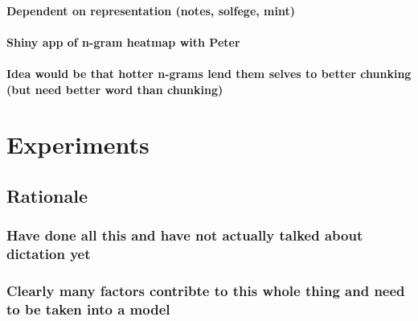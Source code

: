\documentclass[]{book}
\theoremstyle{definition}
\theoremstyle{definition}
\theoremstyle{definition}
\theoremstyle{remark}
\begin{document}
\hypertarget{dependent-on-representation-notes-solfege-mint}{%
\subsubsection{Dependent on representation (notes, solfege,
mint)}\label{dependent-on-representation-notes-solfege-mint}}

\hypertarget{shiny-app-of-n-gram-heatmap-with-peter}{%
\subsubsection{Shiny app of n-gram heatmap with
Peter}\label{shiny-app-of-n-gram-heatmap-with-peter}}

\hypertarget{idea-would-be-that-hotter-n-grams-lend-them-selves-to-better-chunking-but-need-better-word-than-chunking}{%
\subsubsection{Idea would be that hotter n-grams lend them selves to
better chunking (but need better word than
chunking)}\label{idea-would-be-that-hotter-n-grams-lend-them-selves-to-better-chunking-but-need-better-word-than-chunking}}

\hypertarget{experiments}{%
\chapter{Experiments}\label{experiments}}

\hypertarget{rationale}{%
\section{Rationale}\label{rationale}}

\hypertarget{have-done-all-this-and-have-not-actually-talked-about-dictation-yet}{%
\subsection{Have done all this and have not actually talked about
dictation
yet}\label{have-done-all-this-and-have-not-actually-talked-about-dictation-yet}}

\hypertarget{clearly-many-factors-contribte-to-this-whole-thing-and-need-to-be-taken-into-a-model}{%
\subsection{Clearly many factors contribte to this whole thing and need
to be taken into a
model}\label{clearly-many-factors-contribte-to-this-whole-thing-and-need-to-be-taken-into-a-model}}
\end{document}
